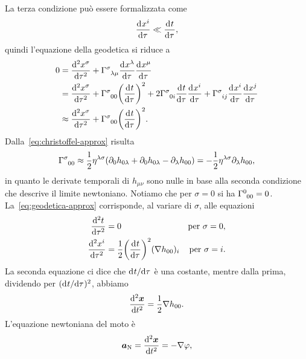 La terza condizione può essere formalizzata come
\begin{equation}
  \toder{x^{i}}{\tau} \ll \toder{t}{\tau},
\end{equation}
quindi l'equazione della geodetica si riduce a
\begin{equation}
  \label{eq:geodetica-approx}
  \begin{split}
    0 &= \toder[2]{x^{\sigma}}{\tau} + \tensor{\Gamma}{^{\sigma}_{\lambda\mu}}
    \toder{x^{\lambda}}{\tau} \toder{x^{\mu}}{\tau} \\
    &= \toder[2]{x^{\sigma}}{\tau} + \tensor{\Gamma}{^{\sigma}_{00}} \bigg(
    \toder{t}{\tau} \bigg)^{2} + 2\tensor{\Gamma}{^{\sigma}_{0i}}\toder{t}{\tau}
    \toder{x^{i}}{\tau} + \tensor{\Gamma}{^{\sigma}_{ij}} \toder{x^{i}}{\tau}
    \toder{x^{j}}{\tau} \\
    &\approx \toder[2]{x^{\sigma}}{\tau} + \tensor{\Gamma}{^{\sigma}_{00}}\bigg(
    \toder{t}{\tau} \bigg)^{2}.
  \end{split}
\end{equation}
Dalla~\eqref{eq:christoffel-approx} risulta
\begin{equation}
  \tensor{\Gamma}{^{\sigma}_{00}} \approx
  \frac{1}{2}\eta^{\lambda\sigma}(\partial_{0}h_{0\lambda}
  + \partial_{0}h_{0\lambda} - \partial_{\lambda}h_{00}) =
  -\frac{1}{2}\eta^{\lambda\sigma} \partial_{\lambda}h_{00},
\end{equation}
in quanto le derivate temporali di $h_{\mu\nu}$ sono nulle in base alla seconda
condizione che descrive il limite newtoniano.  Notiamo che per $\sigma=0$ si ha
$\tensor{\Gamma}{^{0}_{00}}=0$.  La~\eqref{eq:geodetica-approx} corrisponde, al
variare di $\sigma$, alle equazioni
\begin{subequations}
  \begin{align}
    \toder[2]{t}{\tau} &= 0 &\text{per $\sigma = 0$}, \\
    \toder[2]{x^{i}}{\tau} &= \frac{1}{2} \bigg( \toder{t}{\tau} \bigg)^{2}
    (\nabla h_{00})_{i} &\text{per $\sigma = i$}.
  \end{align}
\end{subequations}
La seconda equazione ci dice che $\ltoder{t}{\tau}$ è una costante, mentre dalla
prima, dividendo per $(\ltoder{t}{\tau})^{2}$, abbiamo
\begin{equation}
  \toder[2]{\bm{x}}{t} = \frac{1}{2}\nabla h_{00}.
\end{equation}
L'equazione newtoniana del moto è
\begin{equation}
  \bm{a}_{\textup{N}} = \toder[2]{\bm{x}}{t} = -\nabla\phi,
\end{equation}
